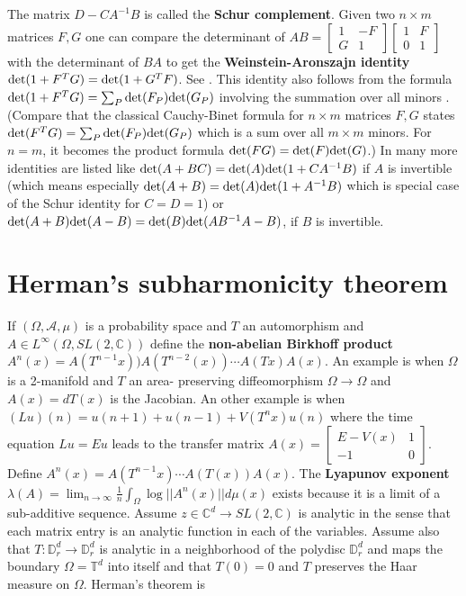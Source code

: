 \documentclass[12pt]{amsart}
\def\satz#1{ \vspace{2mm} \begin{center} \fcolorbox{yellow1}{yellow1}{ \parbox{14.0cm}{{\bf Theorem:} #1}} \vspace{2mm} \end{center} }
\newcounter{example}    \def\example#1{ \item \fontsize{12}{15} \selectfont #1 \fontsize{12}{15} \selectfont }
\begin{document}
\satz{${\rm det}(M) = {\rm det}(A) {\rm det}(D-C A^{-1} B)$}

The matrix $D-C A^{-1} B$ is called the {\bf Schur complement}.
Given two $n \times m$ matrices $F,G$
one can compare the determinant of $A B = \left[ \begin{array}{cc} 1 & -F \\ G & 1 \end{array} \right]
             \left[ \begin{array}{cc} 1 & F  \\ 0 & 1 \end{array}  \right]$
with the determinant of $B A$ to get the {\bf Weinstein-Aronszajn identity}
${\rm det}(1+F^T G) = {\rm det}(1+G^T F)$.  
See \cite{Deift1978,TaoMatrixIdentities}. 
This identity also follows from the formula
${\rm det}(1+F^T G)  = \sum_P {\rm det}(F_P) {\rm det}(G_P)$ 
involving the summation
over all minors \cite{CauchyBinetKnill}. 
(Compare that the classical Cauchy-Binet formula for $n \times m$ matrices $F,G$
states ${\rm det}(F^T G) = \sum_P {\rm det}(F_P) {\rm det}(G_P)$ which is a sum over all 
$m \times m$ minors. For $n=m$, it becomes the product formula ${\rm det}(F G) = {\rm det}(F) {\rm det}(G)$.)
In \cite{TaoMatrixIdentities} many more identities are listed like 
${\rm det}(A+BC) = {\rm det}(A) {\rm det}(1+C A^{-1} B)$ if $A$ is invertible 
(which means especially ${\rm det}(A+B) = {\rm det}(A) {\rm det}(1+A^{-1} B)$
which is special case of the Schur identity for $C=D=1$) or 
${\rm det}(A+B) {\rm det}(A-B) = {\rm det}(B) {\rm det}(A B^{-1} A - B)$, if $B$ is invertible.

\section{Herman's subharmonicity theorem}

If $(\Omega,\mathcal{A},\mu)$ is a probability space and $T$
an automorphism and $A \in L^{\infty}(\Omega,SL(2,\mathbb{C}))$
define the {\bf non-abelian Birkhoff product}
$A^n(x)= A(T^{n-1}x)) A(T^{n-2}(x)) \cdots A(Tx) A(x)$. 
An example is when $\Omega$ is a 2-manifold and $T$ an area-
preserving diffeomorphism $\Omega \to \Omega$ and $A(x)=dT(x)$
is the Jacobian. An other example is when $(Lu)(n) =u(n+1)+u(n-1)+V(T^nx) u(n)$
where the time equation $Lu = Eu$ leads to the transfer matrix 
$A(x) = \left[ \begin{array}{cc} E-V(x) & 1 \\ -1 & 0 \end{array} \right]$. 
Define $A^n(x) = A(T^{n-1}x) \cdots A(T(x)) A(x)$. The {\bf Lyapunov exponent}
$\lambda(A) = \lim_{n \to \infty} \frac{1}{n} \int_{\Omega} \log||A^n(x)|| d\mu(x)$ 
exists because it is a limit of a sub-additive sequence.
Assume $z \in \mathbb{C}^d \to SL(2,\mathbb{C})$ is analytic in the sense
that each matrix entry is an analytic function in each of the variables.
Assume also that $T: \mathbb{D}_r^d \to \mathbb{D}_r^d$ is analytic in a neighborhood
of the polydisc $\mathbb{D}_r^d$ and maps the boundary $\Omega=\mathbb{T}^d$ into itself
and that $T(0)=0$ and $T$ preserves the Haar measure on $\Omega$. Herman's theorem \cite{Her83} is
\end{document}
